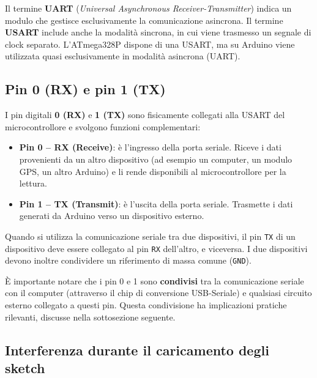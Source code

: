 \begin{tcolorbox}[colback=blue!4, colframe=blue!60, title=\textbf{Approfondimento – Differenza tra USART e UART}]
    Il termine \textbf{UART} (\textit{Universal Asynchronous Receiver-Transmitter}) indica un modulo che gestisce esclusivamente la comunicazione asincrona. Il termine \textbf{USART} include anche la modalità sincrona, in cui viene trasmesso un segnale di clock separato. L'ATmega328P dispone di una USART, ma su Arduino viene utilizzata quasi esclusivamente in modalità asincrona (UART).
\end{tcolorbox}

\subsection*{Pin 0 (RX) e pin 1 (TX)}

I pin digitali \textbf{0 (RX)} e \textbf{1 (TX)} sono fisicamente collegati alla USART del microcontrollore e svolgono funzioni complementari:

\begin{itemize}
    \item \textbf{Pin 0 – RX (Receive)}: è l'ingresso della porta seriale. Riceve i dati provenienti da un altro dispositivo (ad esempio un computer, un modulo GPS, un altro Arduino) e li rende disponibili al microcontrollore per la lettura.
    \item \textbf{Pin 1 – TX (Transmit)}: è l'uscita della porta seriale. Trasmette i dati generati da Arduino verso un dispositivo esterno.
\end{itemize}

Quando si utilizza la comunicazione seriale tra due dispositivi, il pin \texttt{TX} di un dispositivo deve essere collegato al pin \texttt{RX} dell'altro, e viceversa. I due dispositivi devono inoltre condividere un riferimento di massa comune (\texttt{GND}).



È importante notare che i pin 0 e 1 sono \textbf{condivisi} tra la comunicazione seriale con il computer (attraverso il chip di conversione USB-Seriale) e qualsiasi circuito esterno collegato a questi pin. Questa condivisione ha implicazioni pratiche rilevanti, discusse nella sottosezione seguente.

\subsection*{Interferenza durante il caricamento degli sketch}

